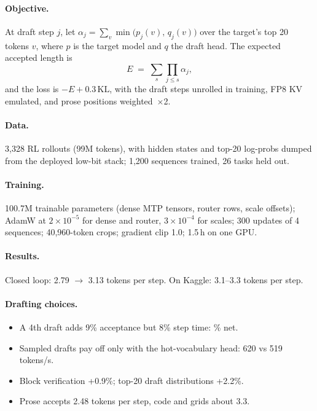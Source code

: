 \documentclass[10pt]{article}
\newcommand{\appminus}{\textminus}
\newcommand{\appminus}{\symbol{"2212}}
\newcommand{\mn}{\appminus}                     %
\begin{document}
\paragraph{Objective.} At draft step $j$, let $\alpha_j = \sum_{v} \min\big(p_j(v),\, q_j(v)\big)$ over the target's
top 20 tokens $v$, where $p$ is the target model and $q$ the draft head. The expected accepted length is
\begin{equation*}
  E \;=\; \sum_{s} \prod_{j \le s} \alpha_j ,
\end{equation*}
and the loss is $-E + 0.3\,\mathrm{KL}$, with the draft steps unrolled in training, FP8 KV emulated, and prose positions
weighted~×2.

\paragraph{Data.} 3,328 RL rollouts (99M tokens), with hidden states and top-20 log-probs dumped from the deployed
low-bit stack; 1,200 sequences trained, 26 tasks held out.

\paragraph{Training.} 100.7M trainable parameters (dense MTP tensors, router rows, scale offsets); AdamW at
$2\times10^{-5}$ for dense and router, $3\times10^{-4}$ for scales; 300 updates of 4 sequences; 40,960-token crops;
gradient clip 1.0; 1.5\,h on one GPU.

\paragraph{Results.} Closed loop: 2.79 $\rightarrow$ 3.13 tokens per step. On Kaggle: 3.1--3.3 tokens per step.

\paragraph{Drafting choices.}
\begin{itemize}
  \item A 4th draft adds 9\% acceptance but 8\% step time: \mn2.4\% net.
  \item Sampled drafts pay off only with the hot-vocabulary head: 620 vs 519 tokens/s.
  \item Block verification +0.9\%; top-20 draft distributions +2.2\%.
  \item Prose accepts 2.48 tokens per step, code and grids about 3.3.
\end{itemize}
\end{document}
